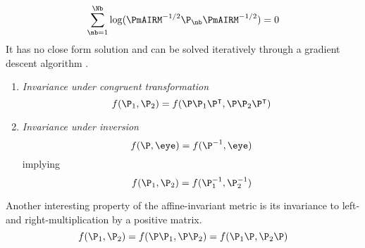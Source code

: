 \iflatexml\else {} \fi
\begin{equation}
\sum_{\nb=1}^\Nb \log(\PmAIRM^{-1/2} \P_\nb \PmAIRM^{-1/2})=0
\label{mean_air}
\end{equation}
It has no close form solution and can be solved iteratively through a gradient descent algorithm \cite{letcher_principal_2004}. 

\iflatexml\else {}  \fi
\begin{enumerate}[label=(\roman*)]
\item \emph{Invariance under congruent transformation}
\begin{equation}
f(\P_1, \P_2) = f(\P \P_1 \P^\intercal, \P \P_2 \P^\intercal)
\label{eq:invar_congr}
\end{equation}
\item \emph{Invariance under inversion}
\begin{equation}
f(\P,\eye) = f(\P^{-1},\eye)
\label{eq:invar_invers}
\end{equation}
implying
\begin{equation}
f(\P_1,\P_2) = f(\P_1^{-1},\P_2^{-1})
\label{eq:invar_invers2}
\end{equation}
\end{enumerate}
Another interesting property of the affine-invariant metric is its invariance to left- and right-multiplication by a positive matrix.
\begin{equation}
f(\P_1, \P_2) = f(\P \P_1, \P \P_2) = f(\P_1 \P, \P_2 \P)
\label{eq:invar_mult}
\end{equation}


